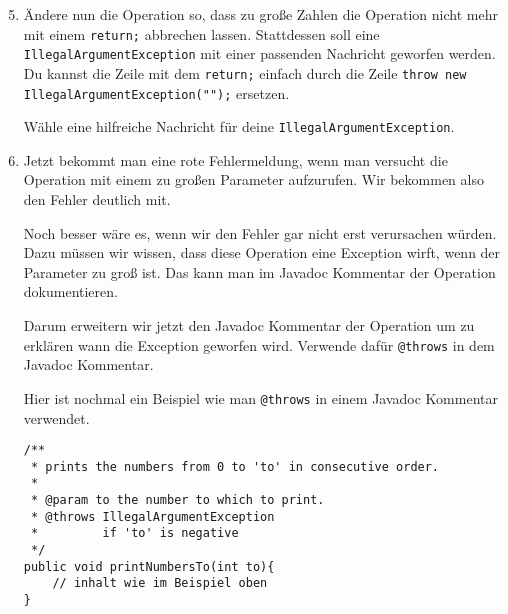 \begin{enumerate}\setcounter{enumi}{4}
	\item
		Ändere nun die Operation so, dass zu große Zahlen die Operation nicht mehr mit einem \lstinline{return;} abbrechen lassen.
		Stattdessen soll eine \lstinline{IllegalArgumentException} mit einer passenden Nachricht geworfen werden.
		Du kannst die Zeile mit dem \lstinline{return;} einfach durch die Zeile \lstinline{throw new IllegalArgumentException("");} ersetzen.

		Wähle eine hilfreiche Nachricht für deine \lstinline{IllegalArgumentException}.

	\item
		Jetzt bekommt man eine rote Fehlermeldung, wenn man versucht die Operation mit einem zu großen Parameter aufzurufen.
		Wir bekommen also den Fehler deutlich mit.

		Noch besser wäre es, wenn wir den Fehler gar nicht erst verursachen würden.
		Dazu müssen wir wissen, dass diese Operation eine Exception wirft, wenn der Parameter zu groß ist.
		Das kann man im Javadoc Kommentar der Operation dokumentieren.
		
		Darum erweitern wir jetzt den Javadoc Kommentar der Operation um zu erklären wann die Exception geworfen wird. 
		Verwende dafür \lstinline{@throws} in dem Javadoc Kommentar.

		Hier ist nochmal ein Beispiel wie man \lstinline{@throws} in einem Javadoc Kommentar verwendet.

		\begin{lstlisting}
/**
 * prints the numbers from 0 to 'to' in consecutive order.
 * 
 * @param to the number to which to print.
 * @throws IllegalArgumentException
 *         if 'to' is negative
 */
public void printNumbersTo(int to){
    // inhalt wie im Beispiel oben
}
		\end{lstlisting}
\end{enumerate}
\newpage
